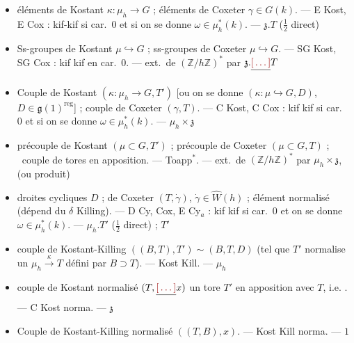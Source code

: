 \documentclass[11pt,a4paper]{article}
\begin{document}
\begin{itemize}
  \item éléments de Kostant $\kappa : \mu_h \to G$ ; éléments de Coxeter
  $\gamma \in G(k)$. --- E Kost, E Cox : kif-kif si car.~$0$ et si on se donne
  $\omega \in \mu_h^{*}(k)$. ---
   \struck{\ill{}}
  $\mathfrak{z}.T$ ($\tfrac12$ direct)
  \item {} Ss-groupes de Kostant $\mu \hookrightarrow G$ ;
  ss-groupes de Coxeter $\mu \hookrightarrow G$. --- SG Kost, SG Cox : kif kif
  en car.~$0$. --- ext.\ de $(\mathbb{Z}/h\mathbb{Z})^{*}$ par
  $\mathfrak{z}.\struck{\ill{}}T$
  \item Couple de Kostant $(\kappa : \mu_h \to G, T')$ [ou on se donne
  $(\kappa : \mu \hookrightarrow G, D)$, $D \in \hat{\mathfrak{g}}(1)^{\mathrm{reg}}$] ;
  couple de Coxeter $(\gamma, T)$. --- C Kost, C Cox : kif kif si car.~$0$ et
  si on se donne $\omega \in \mu_h^{*}(k)$. --- $\mu_h \times \mathfrak{z}$
  \item précouple de Kostant $(\mu \subset G, T')$ ; précouple de Coxeter
  $(\mu \subset G, T)$ ; \ couple de tores en apposition. ---
   Toapp$^{*}$. --- ext.\ de
  $(\mathbb{Z}/h\mathbb{Z})^{*}$ par $\mu_h \times \mathfrak{z}$, (ou produit)
  \item droites cycliques $D$ ;  \struck{\ill{}} de Coxeter
  $(T, \dot{\gamma})$, $\dot{\gamma} \in \hat{W}(h)$ ; élément
   normalisé (dépend du $\delta$ Killing). --- D Cy,
  \struck{\ill{}} Cox, E Cy$_a$ : kif kif si car.~$0$ et on se donne
  $\omega \in \mu_h^{*}(k)$. --- $\mu_h.T'$ ($\tfrac12$ direct) ; $T'$
  \item couple  de Kostant-Killing
  $((B,T),T') \sim (B,T,D)$ (tel que $T'$ normalise un
  $\mu_h \xrightarrow{\kappa} T$ défini par $B \supset T$). ---
  \struck{\ill{}} Kost Kill. --- $\mu_h$
  \item couple  de  Kostant normalisé
  $(T, \struck{\ill{}}x)$ 
   un tore $T'$ en apposition avec $T$, i.e.
  \ill{}. ---  C Kost norma. --- $\mathfrak{z}$
  \item Couple de Kostant-Killing normalisé $((T,B),x)$. --- Kost Kill norma.
  --- $1$
\end{itemize}
\end{document}
